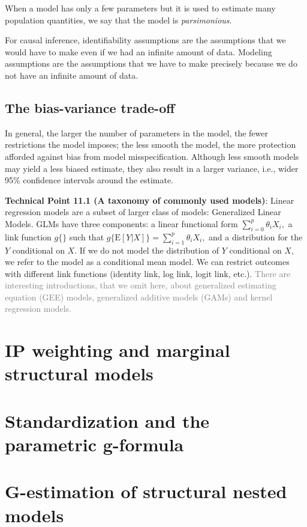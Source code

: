 \documentclass{article}
\begin{document}
When a model has only a few parameters but it is used to estimate many population quantities, we say that the model is \textit{parsimonious}.

For causal inference, identifiability assumptions are the assumptions that we would have to make even if we had an infinite amount of data. Modeling assumptions are the assumptions that we have to make precisely because we do not have an infinite amount of data.

\subsection{The bias-variance trade-off}
In general, the larger the number of parameters in the model, the fewer restrictions the model imposes; the less smooth the model, the more protection afforded against bias from model misspecification. Although less smooth models may yield a less biased estimate, they also result in a larger variance, i.e., wider 95\% confidence intervals around the estimate. 

\textbf{Technical Point 11.1 (A taxonomy of commonly used models)}: Linear regression models are a subset of larger class of models: Generalized Linear Models. GLMs have three components: a linear functional form $\sum_{i=0}^{p} \theta_{i} X_{i},$ a link function $g\{\}$ such that $g\{\mathrm{E}[Y | X]\}=\sum_{i=1}^{p} \theta_{i} X_{i},$ and a distribution for the $Y$ conditional on $X .$ If we do not model the distribution of $Y$ conditional on $X,$ we refer to the model as a conditional mean model. We can restrict outcomes with different link functions (identity link, log link, logit link, etc.). \textcolor{gray}{There are interesting introductions, that we omit here, about generalized estimating equation (GEE) models, generalized additive models (GAMs) and kernel regression models.}
\section{IP weighting and marginal structural models}

\section{Standardization and the parametric g-formula}

\section{G-estimation of structural nested models}
\end{document}
